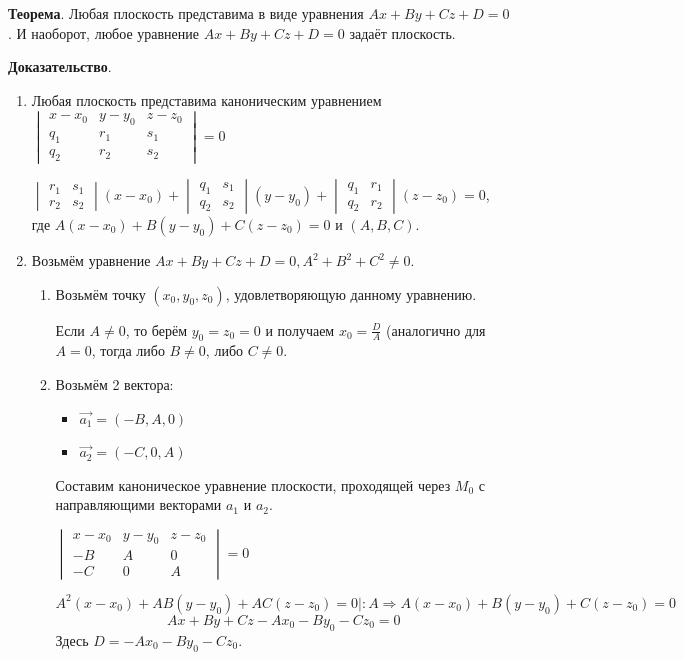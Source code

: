 \documentclass[a4paper]{article}
\begin{document}
\textbf{Теорема}. Любая плоскость представима в виде уравнения $Ax+By+Cz+D=0$. И наоборот, любое уравнение $Ax+By+Cz+D=0$ задаёт плоскость.

\textbf{Доказательство}. \begin{enumerate}
\item Любая плоскость представима каноническим уравнением $\begin{vmatrix}
	x-x_0& y-y_0& z-z_0\\
	q_1& r_1& s_1\\
	q_2& r_2& s_2
\end{vmatrix} = 0$\newline

$\begin{vmatrix}
	r_1& s_1\\
	r_2&s_2
\end{vmatrix}(x-x_0)+ \begin{vmatrix}
	q_1& s_1\\
	q_2&s_2
\end{vmatrix} (y-y_0)+ \begin{vmatrix}
	q_1& r_1\\
	q_2&r_2
\end{vmatrix} (z-z_0) = 0$, где $A(x-x_0)+B(y-y_0)+C(z-z_0) = 0$ и $(A,B,C)$.

\item Возьмём уравнение $Ax+By+Cz+D=0, A^2 + B^2 + C^2 \neq 0$.
\begin{enumerate}
\item Возьмём точку $(x_0, y_0, z_0)$, удовлетворяющую данному уравнению.

Если $A\neq 0$, то берём $y_0 = z_0 = 0$ и получаем $\displaystyle x_0 = \frac{D}{A}$ (аналогично для $A=0$, тогда либо $B \neq 0$, либо $C \neq 0$.

\item Возьмём 2 вектора: 

\begin{itemize}
\item $\vec{a_1} = (-B, A, 0)$
\item $\vec{a_2} = (-C, 0, A)$
\end{itemize}

Составим каноническое уравнение плоскости, проходящей через $M_0$ с направляющими векторами $a_1$ и $a_2$.

$\begin{vmatrix}
	x-x_0& y-y_0& z-z_0\\
	-B& A& 0\\
	-C& 0& A
\end{vmatrix} = 0$

\begin{equation}
A^2(x-x_0) + AB(y-y_0)+AC(z-z_0) = 0|:A \Rightarrow A(x-x_0) + B(y-y_0)+C(z-z_0) = 0 
\end{equation}
\begin{equation}
Ax+By+Cz - Ax_0 - By_0 -Cz_0 = 0
\end{equation}
Здесь $D = - Ax_0 - By_0 -Cz_0$.

\end{enumerate}
\end{enumerate}
\end{document}
